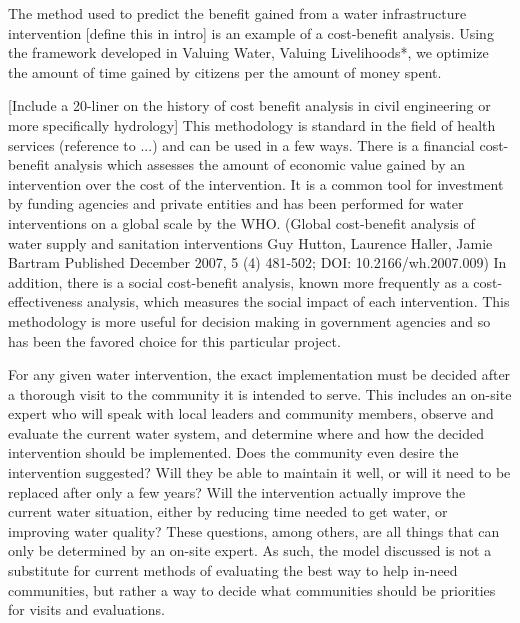 The method used to predict the benefit gained from a water infrastructure intervention [define this in intro] is an example of a cost-benefit analysis. Using the framework developed in Valuing Water, Valuing Livelihoods*, we optimize the amount of time gained by citizens per the amount of money spent.

[Include a 20-liner on the history of cost benefit analysis in civil engineering or more specifically hydrology]
This methodology is standard in the field of health services (reference to ...) and can be used in a few ways.
There is a financial cost-benefit analysis which assesses the amount of economic value gained by an intervention over the cost of the intervention.
It is a common tool for investment by funding agencies and private entities and has been performed for water interventions on a global scale by the WHO. (Global cost-benefit analysis of water supply and sanitation interventions Guy Hutton, Laurence Haller, Jamie Bartram Published December 2007, 5 (4) 481-502; DOI: 10.2166/wh.2007.009)
In addition, there is a social cost-benefit analysis, known more frequently as a cost-effectiveness analysis, which measures the social impact of each intervention.
This methodology is more useful for decision making in government agencies and so has been the favored choice for this particular project.

For any given water intervention, the exact implementation must be decided after a thorough visit to the community it is intended to serve.
This includes an on-site expert who will speak with local leaders and community members, observe and evaluate the current water system, and determine where and how the decided intervention should be implemented.
Does the community even desire the intervention suggested?
Will they be able to maintain it well, or will it need to be replaced after only a few years?
Will the intervention actually improve the current water situation, either by reducing time needed to get water, or improving water quality?
These questions, among others, are all things that can only be determined by an on-site expert.
As such, the model discussed is not a substitute for current methods of evaluating the best way to help in-need communities, but rather a way to decide what communities should be priorities for visits and evaluations.

